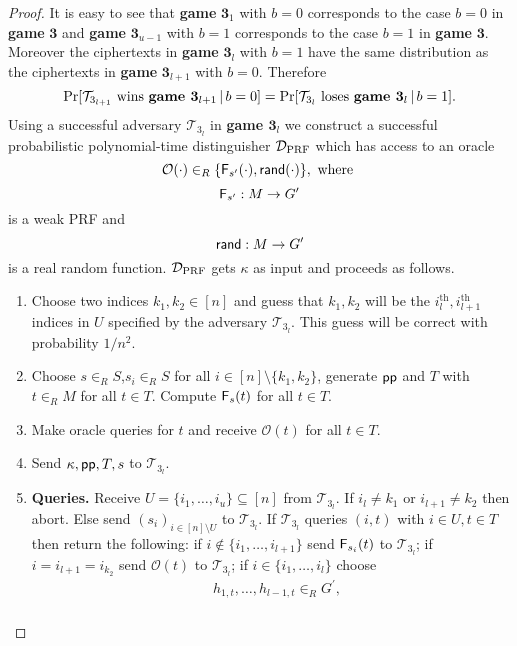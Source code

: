 \documentclass[10pt]{extarticle}
\begin{document}
\begin{proof}
\noindent It is easy to see that \textbf{game} $\boldsymbol 3_1$ with $b=0$ corresponds to the case $b=0$ in \textbf{game} $\boldsymbol 3$ and \textbf{game} $\boldsymbol 3_{u-1}$ with $b=1$ corresponds to the case $b=1$ in \textbf{game} $\boldsymbol 3$. Moreover the ciphertexts in \textbf{game} $\boldsymbol 3_l$ with $b=1$ have the same distribution as the ciphertexts in \textbf{game} $\boldsymbol 3_{l+1}$ with $b=0$. Therefore
\[\Pr[\mathcal{T}_{3_{l+1}}\mbox{ wins \textbf{game }} \boldsymbol 3_{l+1}\,|\,b=0]=\Pr[\mathcal{T}_{3_l}\mbox{ loses \textbf{game }} \boldsymbol 3_l\,|\,b=1].\]
Using a successful adversary $\mathcal{T}_{3_l}$ in \textbf{\upshape game $\boldsymbol 3_l$} we construct a successful probabilistic polynomial-time distinguisher $\mathcal{D}_{\mbox{\scriptsize PRF}}$ which has access to an oracle 
\[\mathcal{O}(\cdot)\in_R\{\text{\upshape\sffamily F}_{s^\prime}(\cdot),\mbox{\upshape\sffamily rand}(\cdot)\},\mbox{ where }\] 
\[\text{\upshape\sffamily F}_{s^\prime}:M\to G^\prime\] 
is a weak PRF and 
\[\mbox{\upshape\sffamily rand}:M\to G^\prime\] 
is a real random function. $\mathcal{D}_{\mbox{\scriptsize PRF}}$ gets $\kappa$ as input and proceeds as follows.
\noindent\begin{enumerate}
\item Choose two indices $k_1,k_2\in[n]$ and guess that $k_1, k_2$ will be the $i_l^{\text{th}},i_{l+1}^{\text{th}}$ indices in $U$ specified by the adversary $\mathcal{T}_{3_l}$. This guess will be correct with probability $1/n^2$.
\item Choose $s\in_R S$,$s_i\in_R S$ for all $i\in[n]\setminus\{k_1,k_2\}$, generate $\mbox{\upshape\sffamily pp}$ and $T$ with $t\in_R M$ for all $t\in T$. Compute $\text{\upshape\sffamily F}_s(t)$ for all $t\in T$.
\item Make oracle queries for $t$ and receive $\mathcal{O}(t)$ for all $t\in T$.
\item Send $\kappa, \mbox{\upshape\sffamily pp},T, s$ to $\mathcal{T}_{3_l}$.
\item\textbf{Queries.} Receive $U=\{i_1,\ldots,i_u\}\subseteq[n]$ from $\mathcal{T}_{3_l}$. If $i_l\neq k_1$ or $i_{l+1}\neq k_2$ then abort. Else send $(s_i)_{i\in[n]\setminus U}$ to $\mathcal{T}_{3_l}$.
 If $\mathcal{T}_{3_l}$ queries $(i,t)$ with $i\in U, t\in T$ then return the following: if $i\notin \{i_1,\ldots,i_{l+1}\}$ send $\text{\upshape\sffamily F}_{s_i}(t)$ to $\mathcal{T}_{3_l}$; if $i=i_{l+1}=i_{k_2}$ send $\mathcal{O}(t)$ to $\mathcal{T}_{3_l}$; if $i\in \{i_1,\ldots,i_l\}$ choose 
\begin{align*} & h_{1,t},\ldots,h_{l-1,t}\in_R G^\prime,\\ 

\end{align*}
\end{enumerate}
\end{proof}
\end{document}
